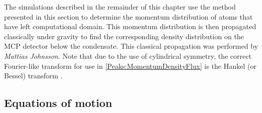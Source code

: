\parasep

The simulations described in the remainder of this chapter use the method presented in this section to determine the momentum distribution of atoms that have left computational domain. This momentum distribution is then propagated classically under gravity to find the corresponding density distribution on the MCP detector below the condensate. This classical propagation was performed by \emph{Mattias Johnsson}. Note that due to the use of cylindrical symmetry, the correct Fourier-like transform for use in \eqref{Peaks:MomentumDensityFlux} is the Hankel (or Bessel) transform \citep{ArfkeyWeber}.

% 

\subsection{Equations of motion}

